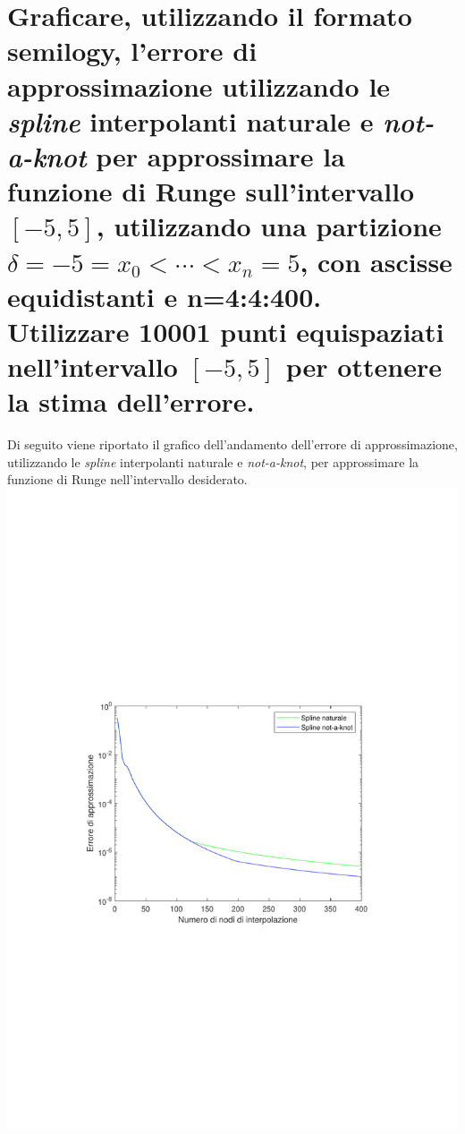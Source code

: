 \documentclass[10pt,a4paper]{article}
\begin{document}
\section{
Graficare, utilizzando il formato semilogy, l'errore di approssimazione utilizzando le
\textit{spline} interpolanti naturale e \textit{not-a-knot} per approssimare la funzione di Runge sull'intervallo $ [-5,5] $,
utilizzando una partizione $ \delta = {-5 = x_0 < \cdots < x_n = 5} $, con ascisse equidistanti e \textbf{n=4:4:400}.
\\
Utilizzare 10001 punti equispaziati nell'intervallo $ [-5,5] $ per ottenere la stima dell'errore.
}
Di seguito viene riportato il grafico dell'andamento dell'errore di approssimazione, utilizzando
le \textit{spline} interpolanti naturale e \textit{not-a-knot}, per approssimare la funzione di 
Runge nell'intervallo desiderato.
\\
\includegraphics*[scale=0.80]{./esercizi/imgs/grafico_23.pdf}
\end{document}
